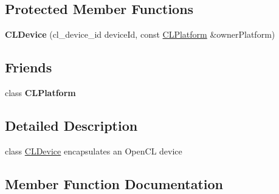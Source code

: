 \subsection*{Protected Member Functions}
\begin{DoxyCompactItemize}
\item 
{\bfseries C\+L\+Device} (cl\+\_\+device\+\_\+id device\+Id, const \hyperlink{class_c_l_ray_tracer_1_1_open_c_l_utils_1_1_c_l_platform}{C\+L\+Platform} \&owner\+Platform)\hypertarget{class_c_l_ray_tracer_1_1_open_c_l_utils_1_1_c_l_device_a2ecd77313c2be704d284629585b2bdbd}{}\label{class_c_l_ray_tracer_1_1_open_c_l_utils_1_1_c_l_device_a2ecd77313c2be704d284629585b2bdbd}

\end{DoxyCompactItemize}
\subsection*{Friends}
\begin{DoxyCompactItemize}
\item 
class {\bfseries C\+L\+Platform}\hypertarget{class_c_l_ray_tracer_1_1_open_c_l_utils_1_1_c_l_device_afc81804ecaae3987bb3db7b0479f5ee3}{}\label{class_c_l_ray_tracer_1_1_open_c_l_utils_1_1_c_l_device_afc81804ecaae3987bb3db7b0479f5ee3}

\end{DoxyCompactItemize}


\subsection{Detailed Description}
class \hyperlink{class_c_l_ray_tracer_1_1_open_c_l_utils_1_1_c_l_device}{C\+L\+Device} encapsulates an Open\+CL device 

\subsection{Member Function Documentation}
